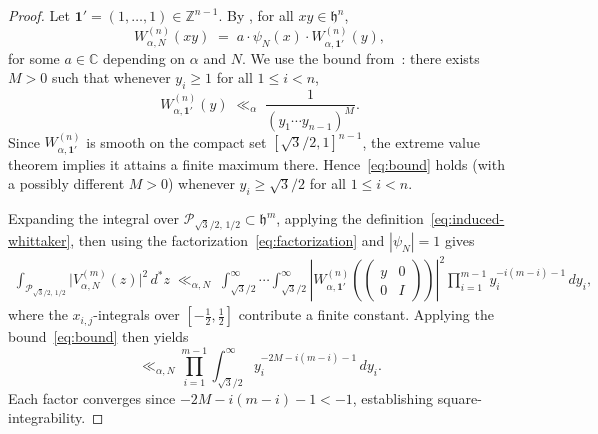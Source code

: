\documentclass[12pt, reqno, oneside]{amsart}
\theoremstyle{definition}
\numberwithin{equation}{section}
\newcommand{\Z}{\mathbb{Z}}
\newcommand{\C}{\mathbb{C}}
\newcommand{\hh}{\mathfrak{h}}
\begin{document}
\begin{proof}
Let $\mathbf{1}'=(1,\ldots,1)\in\Z^{n-1}$. By
\cite[Proposition~5.5.2]{Gol06}, for all $xy\in\hh^n$,
\begin{equation}\label{eq:factorization}
  W_{\alpha,N}^{(n)}(xy) \;=\; a\cdot\psi_N(x)\cdot W_{\alpha,\mathbf{1}'}^{(n)}(y),
\end{equation}
for some $a\in\C$ depending on $\alpha$ and $N$. We use the bound
from~\cite[p.~76]{GMW21}: there exists $M>0$ such that whenever
$y_i\geq 1$ for all $1\leq i<n$,
\begin{equation}\label{eq:bound}
  W_{\alpha,\mathbf{1}'}^{(n)}(y)
  \;\ll_\alpha\;
  \frac{1}{(y_1\cdots y_{n-1})^M}.
\end{equation}
Since $W_{\alpha,\mathbf{1}'}^{(n)}$ is smooth on the compact set
$[\sqrt{3}/2,1]^{n-1}$, the extreme value theorem implies it attains a
finite maximum there. Hence~\eqref{eq:bound} holds (with a possibly
different $M>0$) whenever $y_i\geq\sqrt{3}/2$ for all $1\leq i<n$.

Expanding the integral over $\mathcal{P}_{\!\sqrt{3}/2,\,1/2}\subset\hh^m$,
applying the definition~\eqref{eq:induced-whittaker}, then using the
factorization~\eqref{eq:factorization} and $|\psi_N|=1$ gives
\begin{align*}
  \int_{\mathcal{P}_{\!\sqrt{3}/2,\,1/2}}
  \bigl|V_{\alpha,N}^{(m)}(z)\bigr|^2\,d^*z
  \;\ll_{\alpha,N}\;
  \int_{\sqrt{3}/2}^\infty\cdots\int_{\sqrt{3}/2}^\infty
  \left|W_{\alpha,\mathbf{1}'}^{(n)}\!\left(
    \begin{pmatrix}y&0\\0&I\end{pmatrix}
  \right)\right|^2
  \prod_{i=1}^{m-1} y_i^{-i(m-i)-1}\,dy_i,
\end{align*}
where the $x_{i,j}$-integrals over $[-\tfrac{1}{2},\tfrac{1}{2}]$ contribute
a finite constant. Applying the bound~\eqref{eq:bound} then yields
\[
  \ll_{\alpha,N}
  \prod_{i=1}^{m-1}
  \int_{\sqrt{3}/2}^\infty y_i^{-2M-i(m-i)-1}\,dy_i.
\]
Each factor converges since $-2M-i(m-i)-1<-1$, establishing
square-integrability.
\end{proof}

\printbibliography
\end{document}

